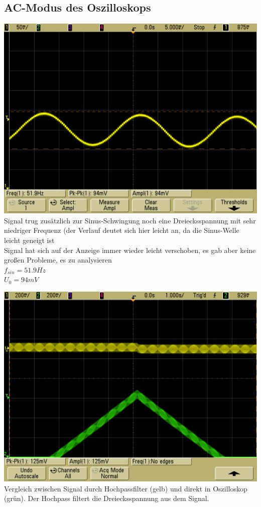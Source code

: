 \documentclass{article}
\begin{document}
\subsection{AC-Modus des Oszilloskops}
\includegraphics[width=\textwidth]{../daten/scope_16}
Signal trug zusätzlich zur Sinus-Schwingung noch eine Dreiecksspannung mit sehr niedriger Frequenz (der Verlauf deutet sich hier leicht an, da die Sinus-Welle leicht geneigt ist \\
Signal hat sich auf der Anzeige immer wieder leicht verschoben, es gab aber keine großen Probleme, es zu analysieren\\
$f_{sin} = 51.9 Hz$\\
$U_0 = 94 mV$

\includegraphics[width=\textwidth]{../daten/scope_21}
Vergleich zwischen Signal durch Hochpassfilter (gelb) und direkt in Oszilloskop (grün). Der Hochpass filtert die Dreiecksspannung aus dem Signal.
\end{document}
